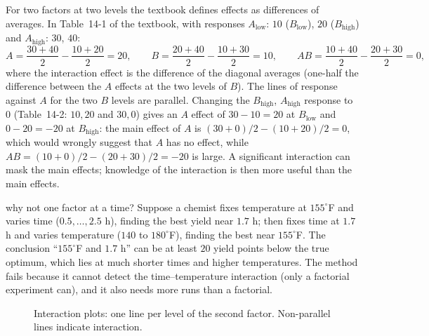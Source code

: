 For two factors at two levels the textbook defines effects as differences of averages. In Table~14-1 of the textbook, with responses $A_{\text{low}}$: $10$ ($B_{\text{low}}$), $20$ ($B_{\text{high}}$) and $A_{\text{high}}$: $30$, $40$:
\[ A=\frac{30+40}2-\frac{10+20}2=20,\qquad B=\frac{20+40}2-\frac{10+30}2=10,\qquad AB=\frac{10+40}2-\frac{20+30}2=0, \]
where the interaction effect is the difference of the diagonal averages (one-half the difference between the $A$ effects at the two levels of $B$). The lines of response against $A$ for the two $B$ levels are parallel. Changing the $B_{\text{high}}$, $A_{\text{high}}$ response to $0$ (Table~14-2: $10, 20$ and $30, 0$) gives an $A$ effect of $30-10=20$ at $B_{\text{low}}$ and $0-20=-20$ at $B_{\text{high}}$: the main effect of $A$ is $(30+0)/2-(10+20)/2=0$, which would wrongly suggest that $A$ has no effect, while $AB=(10+0)/2-(20+30)/2=-20$ is large. A significant interaction can mask the main effects; knowledge of the interaction is then more useful than the main effects.

\begin{nuance}{why not one factor at a time?}
Suppose a chemist fixes temperature at $155^\circ$F and varies time ($0.5,\dots,2.5$ h), finding the best yield near $1.7$ h; then fixes time at $1.7$ h and varies temperature ($140$ to $180^\circ$F), finding the best near $155^\circ$F. The conclusion ``$155^\circ$F and $1.7$ h'' can be at least $20$ yield points below the true optimum, which lies at much shorter times and higher temperatures. The method fails because it cannot detect the time--temperature interaction (only a factorial experiment can), and it also needs more runs than a factorial.
\end{nuance}

\begin{figure}[h]
\centering
{}
\caption{Interaction plots: one line per level of the second factor. Non-parallel lines indicate interaction.}
\end{figure}


